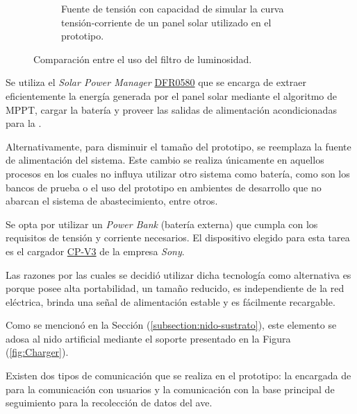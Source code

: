 \begin{figure}[H]
\begin{subfigure}{0.3\textwidth}
        	\caption{Fuente de tensión con capacidad de simular la curva tensión-corriente de un panel solar utilizado en el prototipo.}
			\label{fig:fuente_prototipo}
        \end{subfigure}
	\caption{Comparación entre el uso del filtro de luminosidad.}
	\label{fig:elementos_prototipo}
\end{figure}

Se utiliza el \textit{Solar Power Manager} \href{https://wiki.dfrobot.com/Solar_Power_Manager_For_12V_Lead-Acid_Battery_SKU__DFR0580}{DFR0580} que se encarga de extraer eficientemente la energía generada por el panel solar mediante el algoritmo de MPPT, cargar la batería y proveer las salidas de alimentación acondicionadas para la \rpi.

Alternativamente, para disminuir el tamaño del prototipo, se reemplaza la fuente de alimentación del sistema. Este cambio se realiza únicamente en aquellos procesos en los cuales no influya utilizar otro sistema como batería, como son los bancos de prueba o el uso del prototipo en ambientes de desarrollo que no abarcan el sistema de abastecimiento, entre otros.

Se opta por utilizar un \textit{Power Bank} (batería externa) que cumpla con los requisitos de tensión y corriente necesarios. El dispositivo elegido para esta tarea es el cargador \href{https://www.sony.com/electronics/support/res/manuals/W000/W0002536M.pdf}{CP-V3} de la empresa \textit{Sony}.

Las razones por las cuales se decidió utilizar dicha tecnología como alternativa es porque posee alta portabilidad, un tamaño reducido, es independiente de la red eléctrica, brinda una señal de alimentación estable y es fácilmente recargable. 

Como se mencionó en la Sección (\ref{subsection:nido-sustrato}), este elemento se adosa al nido artificial mediante el soporte presentado en la Figura (\ref{fig:Charger}). 

Existen dos tipos de comunicación que se realiza en el prototipo: la encargada de \nodered para la comunicación con usuarios y la comunicación con la base principal de seguimiento para la recolección de datos del ave.
